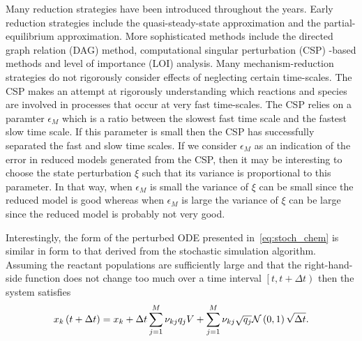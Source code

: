 Many reduction strategies have been introduced throughout 
the years.  Early reduction strategies include the 
quasi-steady-state approximation and the partial-equilibrium 
approximation.  More sophisticated methods include the 
directed graph relation (DAG) method, computational 
singular perturbation (CSP) -based methods and level of 
importance (LOI) analysis.  Many mechanism-reduction 
strategies do not rigorously consider effects of neglecting 
certain time-scales.  The CSP makes an attempt at 
rigorously understanding which reactions and species are 
involved in processes that occur at very fast time-scales.  
The CSP relies on a paramter $\epsilon_{M}$ which is a 
ratio between the slowest fast time scale and the 
fastest slow time scale.  If this parameter is small then 
the CSP has successfully separated the fast and slow 
time scales.  If we consider $\epsilon_{M}$ as an 
indication of the error in reduced models generated from 
the CSP, then it may be interesting to choose the 
state perturbation $\xi$ such that its variance is 
proportional to this parameter.  In that way, when 
$\epsilon_{M}$ is small the variance of $\xi$ can be 
small since the reduced model is good whereas when 
$\epsilon_{M}$ is large the variance of $\xi$ can be 
large since the reduced model is probably not very 
good.

Interestingly, the form of the perturbed ODE presented in~\eqref{eq:stoch_chem} 
is similar in form to that derived from the stochastic simulation algorithm.  
Assuming the reactant populations are sufficiently large and that the 
right-hand-side function does not change too much over a time interval 
$\left[\left.t, t + \Delta t\right)\right.$ then the system satisfies 
\begin{align}
  x_{k}\left(t + \Delta t\right) = x_{k} + \Delta t \sum_{j=1}^{M}{\nu_{kj}q_{j}V} + 
        \sum_{j=1}^{M}{\nu_{kj}\sqrt{q_{j}}\mathcal{N}\left(0,1\right)\sqrt{\Delta t}}.
\end{align}



